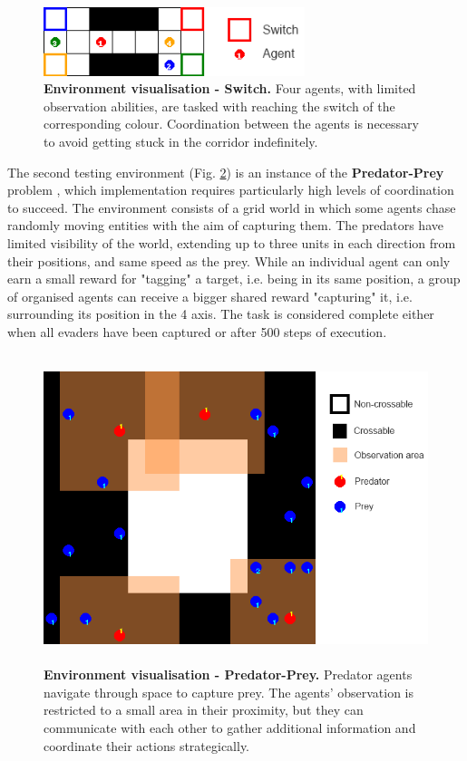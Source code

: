 \documentclass[a4paper,singleside,12pt]{report} %
\begin{document}
\begin{figure}
  \centering
  \includegraphics[height=2cm]{images/switch.png}
  \caption{\textbf{Environment visualisation - Switch.} Four agents, with limited observation abilities, are tasked with reaching the switch of the corresponding colour. Coordination between the agents is necessary to avoid getting stuck in the corridor indefinitely.}
  \label{fig:switch}
\end{figure}

The second testing environment (Fig. \ref{fig:pursuit}) is an instance of the \textbf{Predator-Prey} problem \cite{gupta2017cooperative}, which implementation requires particularly high levels of coordination to succeed. The environment consists of a grid world in which some agents chase randomly moving entities with the aim of capturing them. The predators have limited visibility of the world, extending up to three units in each direction from their positions, and same speed as the prey. While an individual agent can only earn a small reward for "tagging" a target, i.e. being in its same position, a group of organised agents can receive a bigger shared reward "capturing" it, i.e. surrounding its position in the 4 axis. The task is considered complete either when all evaders have been captured or after 500 steps of execution.

\begin{figure}
  \centering
  \includegraphics[height=9cm]{images/pursuit.png}
  \caption{\textbf{Environment visualisation - Predator-Prey.} Predator agents navigate through space to capture prey. The agents' observation is restricted to a small area in their proximity, but they can communicate with each other to gather additional information and coordinate their actions strategically.}
  \label{fig:pursuit}
\end{figure}
\end{document}
